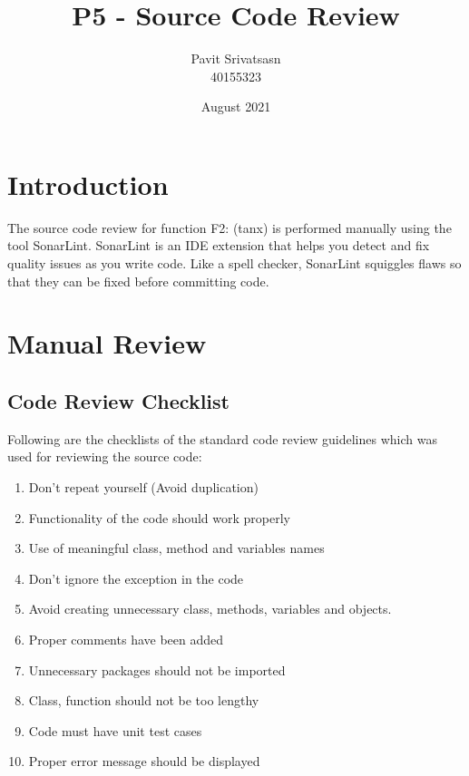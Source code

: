 \documentclass{article}
\title{P5 - Source Code Review}
\author{Pavit Srivatsasn\\ 40155323}
\date{August 2021}
\begin{document}
\maketitle
\section{Introduction}
The source code review for function F2: (tanx) is performed manually using the tool SonarLint. SonarLint is an IDE extension that helps you detect and fix quality issues as you write code. Like a spell checker, SonarLint squiggles flaws so that they can be fixed before committing code.
\section{Manual Review}
    \subsection{Code Review Checklist}
    Following are the checklists of the standard code review guidelines which was used for reviewing the source code:
    \begin{enumerate}
        \item Don’t repeat yourself (Avoid duplication)
        \item Functionality of the code should work properly
        \item Use of meaningful class, method and variables names
        \item Don’t ignore the exception in the code
        \item Avoid creating unnecessary class, methods, variables and objects.
        \item Proper comments have been added
        \item Unnecessary packages should not be imported
        \item Class, function should not be too lengthy
        \item Code must have unit test cases
        \item Proper error message should be displayed
    \end{enumerate}
\end{document}

